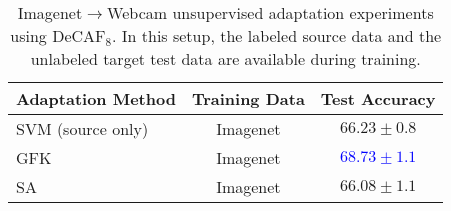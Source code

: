\begin{table*}
\centering
\begin{tabular}{lcc}
\toprule
Adaptation Method & Training Data & Test Accuracy \\
\midrule
SVM (source only) & Imagenet & $66.23 \pm 0.8$ \\
\midrule
GFK \cite{gong-cvpr12} & Imagenet & \textcolor{blue}{$\bm{68.73 \pm 1.1}$} \\
SA \cite{sa} & Imagenet & $66.08 \pm 1.1$ \\
\bottomrule
\end{tabular}
\caption{Imagenet$\rightarrow$Webcam unsupervised adaptation experiments using
  DeCAF$_8$. In this setup, the labeled source data and the unlabeled target
  test data are available during training.}
\label{tab:imagenet_fc8_unsup}
\end{table*}
